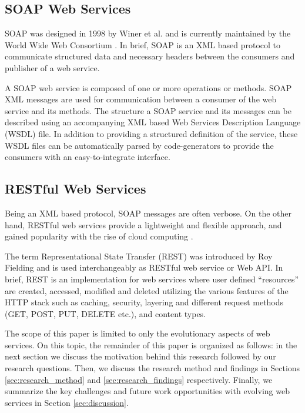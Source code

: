 \documentclass[runningheads,a4paper]{llncs}
\begin{document}
\subsection{SOAP Web Services} %
\label{sub:soap_web_services}
SOAP was designed in 1998 by Winer et al. and is currently maintained by the World Wide Web Consortium \cite{soap_wiki}. In brief, SOAP is an XML based protocol to communicate structured data and necessary headers between the consumers and publisher of a web service.

A SOAP web service is composed of one or more operations or methods. SOAP XML messages are used for communication between a consumer of the web service and its methods. The structure a SOAP service and its messages can be described using an accompanying XML based Web Services Description Language (WSDL) file. In addition to providing a structured definition of the service, these WSDL files can be automatically parsed by code-generators to provide the consumers with an easy-to-integrate interface.


\subsection{RESTful Web Services} %
\label{sub:restful_web_services}
Being an XML based protocol, SOAP messages are often verbose. On the other hand, RESTful web services provide a lightweight and flexible approach, and gained popularity with the rise of cloud computing \cite{mangler2010origin}.

The term Representational State Transfer (REST) was introduced by Roy Fielding \cite{rest_wiki} and is used interchangeably as RESTful web service or Web API. In brief, REST is an implementation for web services where user defined ``resources'' are created, accessed, modified and deleted utilizing the various features of the HTTP stack such as caching, security, layering and different request methods (GET, POST, PUT, DELETE etc.), and content types.


The scope of this paper is limited to only the evolutionary aspects of web services. On this topic, the remainder of this paper is organized as follows: in the next section we discuss the motivation behind this research followed by our research questions. Then, we discuss the research method and findings in Sections \ref{sec:research_method} and \ref{sec:research_findings} respectively. Finally, we summarize the key challenges and future work opportunities with evolving web services in Section \ref{sec:discussion}.
\end{document}
